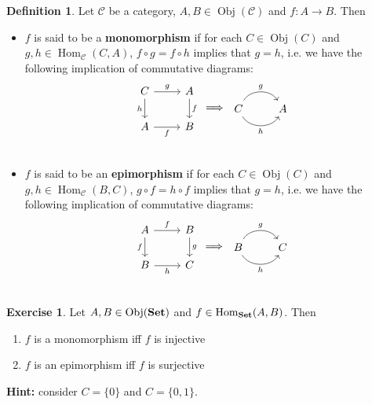 \documentclass[12pt]{amsart}
\theoremstyle{definition}
\newtheorem{defn}[definition]{Definition}
\newtheorem{ex}[definition]{Exercise}
\newcommand{\MC}{\mathcal{C}}
\newcommand{\tbf}[1]{\textbf{#1}}
\DeclareMathOperator{\Obj}{Obj}
\DeclareMathOperator{\Hom}{Hom}
\DeclareMathOperator*{\Set}{\text{\tbf{Set}}}
\DeclareMathOperator*{\0}{\mbf{0}}
\DeclareMathOperator*{\1}{\mbf{1}}
\newcommand{\lex}[1]{\label{ex:#1}}
\newcommand{\ld}[1]{\label{defn:#1}}
\begin{document}
	\begin{defn} \ld{15009}
		Let $\MC$ be a category, $A,B \in \Obj(\MC)$ and $f:A \rightarrow B$. Then 
		\begin{itemize}
			\item 
			$f$ is said to be a \textbf{monomorphism} if for each $C \in \Obj(C)$ and $g,h \in \Hom_{\MC}(C, A)$, $f \circ g = f \circ h$ implies that $g = h$, i.e. we have the following implication of commutative diagrams: 
			\[ 
			\begin{tikzcd}[baseline= 7]
				C \arrow[r, "g"] \arrow[d, "h"'] & A \arrow[d, "f"] \\
				A \arrow[r, "f"'] & B\\
			\end{tikzcd}
			\implies
			\begin{tikzcd}[baseline= 7]
				C \arrow[bend right=60, swap]{r}{h} \arrow[bend right=-60]{r}{g} & A  \\
			\end{tikzcd}
			\]
			\item 
			$f$ is said to be an \textbf{epimorphism} if for each $C \in \Obj(C)$ and $g,h \in \Hom_{\MC}(B, C)$, $g \circ f = h \circ f$ implies that $g = h$, i.e. we have the following implication of commutative diagrams: \\
			\[ 
			\begin{tikzcd}[baseline= 7]
				A \arrow[r, "f"] \arrow[d, "f"'] & B \arrow[d, "g"] \\
				B \arrow[r, "h"'] & C\\
			\end{tikzcd}
			\implies
			\begin{tikzcd}[baseline= 7]
				B \arrow[bend right=60, swap]{r}{h} \arrow[bend right=-60]{r}{g} & C  \\
			\end{tikzcd}
			\]
		\end{itemize}
	\end{defn}
	
	\begin{ex} \lex{15010}
		Let $A, B \in \Obj(\Set)$ and $f \in \Hom_{\Set}(A,B)$. Then 
		\begin{enumerate}
			\item $f$ is a monomorphism iff $f$ is injective
			\item $f$ is an epimorphism iff $f$ is surjective 
		\end{enumerate} 
		\tbf{Hint: } consider $C = \{0\}$ and $C = \{0,1\}$.
	\end{ex}
	
\end{document}
